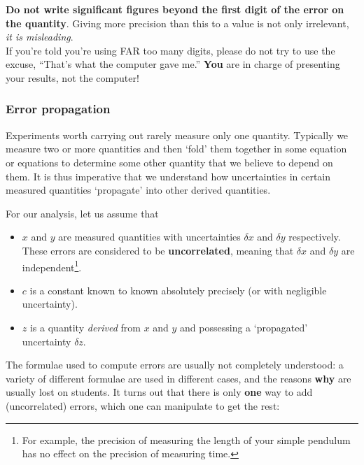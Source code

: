 \begin{imp}
\textbf{Do not write significant figures beyond the first digit of the error on the quantity}. Giving more precision than this to a value is not only irrelevant, \textit{it is misleading}.\\

If you're told you're using FAR too many digits, please do not try to use the excuse, ``That's what the computer gave me.'' \textbf{You} are in charge of presenting your results, not the computer!
\end{imp}


\subsubsection{Error propagation}

Experiments worth carrying out rarely measure only one quantity. Typically we measure two or more quantities and then `fold' them together in some equation or equations to determine some other quantity that we believe to depend on them. It is thus imperative that we understand how uncertainties in certain measured quantities `propagate' into other derived quantities.

For our analysis, let us assume that

\begin{itemize}
    \item $x$ and $y$ are measured quantities with uncertainties $\delta x$ and $\delta y$ respectively. These errors are considered to be \textbf{uncorrelated}, meaning that $\delta x$ and $\delta y$ are independent\footnote{For example, the precision of measuring the length of your simple pendulum has no effect on the precision of measuring time.}.
    
    \item $c$ is a constant known to known absolutely precisely (or with negligible uncertainty).
    
    \item $z$ is a quantity \textit{derived} from $x$ and $y$ and possessing a `propagated' uncertainty $\delta z$.
\end{itemize}

The formulae used to compute errors are usually not completely understood: a variety of different formulae are used in different cases, and the reasons \textbf{why} are usually lost on students. It turns out that there is only \textbf{one} way to add (uncorrelated) errors, which one can manipulate to get the rest:

